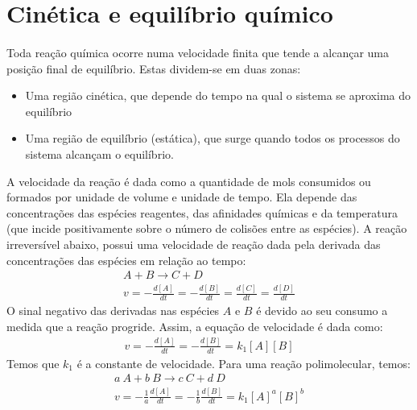 
\section*{Cinética e equilíbrio químico}

\paragraph*{ } Toda reação química ocorre numa velocidade finita que tende a alcançar uma posição final de equilíbrio. Estas dividem-se em duas zonas:

\begin{itemize}
    \item Uma região cinética, que depende do tempo na qual o sistema se aproxima do equilíbrio
    \item Uma região de equilíbrio (estática), que surge quando todos os processos do sistema alcançam o equilíbrio.
\end{itemize}

\begin{definition}
    A velocidade da reação é dada como a quantidade de mols consumidos ou formados por unidade de volume e unidade de tempo. Ela depende das concentrações das espécies reagentes, das afinidades químicas e da temperatura (que incide positivamente sobre o número de colisões entre as espécies). A reação irreversível abaixo, possui uma velocidade de reação dada pela derivada das concentrações das espécies em relação ao tempo:
    \begin{gather}
        A + B \rightarrow C + D \\
        v = -\frac{d[A]}{dt} = -\frac{d[B]}{dt} = \frac{d[C]}{dt} = \frac{d[D]}{dt}
    \end{gather}
    O sinal negativo das derivadas nas espécies $A$ e $B$ é devido ao seu consumo a medida que a reação progride. Assim, a equação de velocidade é dada como:
    \begin{gather}
        v = -\frac{d[A]}{dt} = -\frac{d[B]}{dt} = k_1[A][B]
    \end{gather}
    Temos que $k_1$ é a constante de velocidade. Para uma reação polimolecular, temos:
    \begin{gather}
        a \ A + b \ B \rightarrow c \ C + d \ D \\
        v = -\frac{1}{a} \frac{d[A]}{dt} = -\frac{1}{b} \frac{d[B]}{dt} = k_1[A]^a [B]^b
    \end{gather}
\end{definition}

